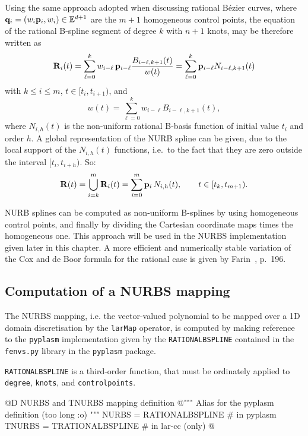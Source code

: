 \documentclass[11pt,oneside]{article}	%
\def\E{\mathbb{E}}
\def\p#1{{\bf #1}}
\begin{document}
Using the same approach adopted when discussing rational B\'ezier
curves, where $\p{q}_{i} = (w_{i}\p{p}_{i}, w_{i})\in\E^{d+1}$ are the
$m+1$ homogeneous control points, the equation of the rational
B-spline segment of degree $k$ with $n+1$ knots, may be therefore
written as
\begin{equation}
    \p{R}_i(t) = 
    \sum_{\ell=0}^k 
    w_{i-\ell}\,\p{p}_{i-\ell} 
    {B_{i-\ell,k+1}(t) \over w(t)}
 = 
    \sum_{\ell=0}^k 
    \p{p}_{i-\ell} 
    N_{i-\ell,k+1}(t)
    \label{eq:NUBgeneriche1}
\end{equation}
with $ k\leq i\leq m$,  $t\in [t_{i}, t_{i+1})$, and
\[
w(t) = \sum_{\ell=0}^k
w_{i-\ell} B_{i-\ell,k+1}(t),
\]
where $N_{i,h}(t)$ is the non-uniform rational
B-basis function of initial value $t_{i}$ and order $h$.
A global representation of the NURB spline can be given, due to the 
local support of the $N_{i,h}(t)$ functions, i.e.~to the fact that 
they are zero outside the interval $[t_{i},t_{i+h})$. So:
\[
\p{R}(t) =  \bigcup_{i=k}^{m} \p{R}_i(t) = 
\sum_{i=0}^{m}\p{p}_{i}\,N_{i,h}(t), \qquad t\in [t_{k},t_{m+1}).
\]

NURB splines can be computed as non-uniform B-splines by using homogeneous
control points, and finally by dividing the Cartesian coordinate
maps times the homogeneous one.  This approach will be used in
the NURBS implementation given later in this chapter.  A more
efficient and numerically stable variation of the Cox and de Boor
formula for the rational case is given by
Farin~\cite{Farin:88}, p.~196.


\subsection{Computation of a NURBS mapping}

The NURBS mapping, i.e. the vector-valued polynomial to be mapped over a 1D domain
discretisation by the \texttt{larMap} operator, is computed by making reference to the 
\texttt{pyplasm} implementation given by the \texttt{RATIONALBSPLINE} contained in the 
\texttt{fenvs.py} library in the \texttt{pyplasm} package.

\texttt{RATIONALBSPLINE} is a third-order function, that must be ordinately applied to 
\texttt{degree}, \texttt{knots}, and \texttt{controlpoints}.

@D NURBS and TNURBS mapping definition
@{""" Alias for the pyplasm definition (too long :o) """
NURBS = RATIONALBSPLINE     # in pyplasm
TNURBS = TRATIONALBSPLINE	 # in lar-cc (only)
@}
\end{document}
